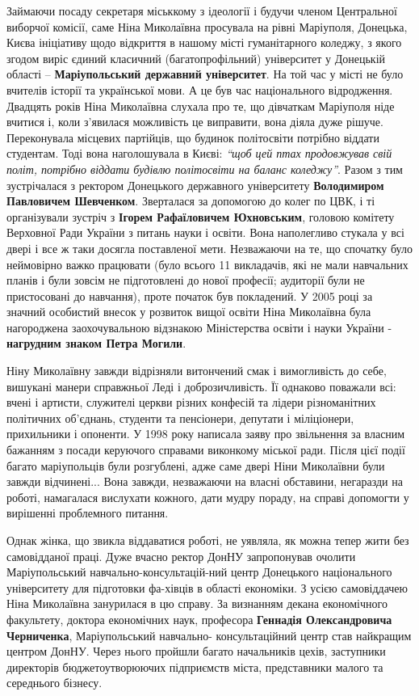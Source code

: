 Займаючи посаду секретаря міськкому з ідеології і будучи членом Центральної
виборчої комісії, саме Ніна Миколаївна просувала на рівні Маріуполя, Донецька,
Києва ініціативу щодо відкриття в нашому місті гуманітарного коледжу, з якого
згодом виріс єдиний класичний (багатопрофільний) університет у Донецькій
області – \textbf{Маріупольський державний університет}. На той час у місті не
було вчителів історії та української мови. А це був час національного
відродження.  Двадцять років Ніна Миколаївна слухала про те, що дівчаткам
Маріуполя ніде вчитися і, коли з'явилася можливість це виправити, вона діяла
дуже рішуче.  Переконувала місцевих партійців, що будинок політосвіти потрібно
віддати студентам. Тоді вона наголошувала в Києві: \emph{\enquote{щоб цей птах
продовжував свій політ, потрібно віддати будівлю політосвіти на баланс
коледжу}}. Разом з тим зустрічалася з ректором Донецького державного
університету \textbf{Володимиром Павловичем Шевченком}. Зверталася за допомогою
до колег по ЦВК, і ті організували зустріч з \textbf{Ігорем Рафаїловичем
Юхновським}, головою комітету Верховної Ради України з питань науки і освіти.
Вона наполегливо стукала у всі двері і все ж таки досягла поставленої мети.
Незважаючи на те, що спочатку було неймовірно важко працювати (було всього 11
викладачів, які не мали навчальних планів і були зовсім не підготовлені до
нової професії; аудиторії були не пристосовані до навчання), проте початок був
покладений. У 2005 році за значний особистий внесок у розвиток вищої освіти
Ніна Миколаївна була нагороджена заохочувальною відзнакою Міністерства освіти і
науки України - \textbf{нагрудним знаком Петра Могили}.

Ніну Миколаївну завжди відрізняли витончений смак і вимогливість до себе,
вишукані манери справжньої Леді і доброзичливість. Її однаково поважали всі:
вчені і артисти, служителі церкви різних конфесій та лідери різноманітних
політичних об'єднань, студенти та пенсіонери, депутати і міліціонери,
прихильники і опоненти. У 1998 року написала заяву про звільнення за власним
бажанням з посади керуючого справами виконкому міської ради. Після цієї події
багато маріупольців були розгублені, адже саме двері Ніни Миколаївни були
завжди відчинені... Вона завжди, незважаючи на власні обставини, негаразди на
роботі, намагалася вислухати кожного, дати мудру пораду, на справі допомогти у
вирішенні проблемного питання.

Однак жінка, що звикла віддаватися роботі, не уявляла, як можна тепер жити без
самовідданої праці. Дуже вчасно ректор ДонНУ запропонував очолити
Маріупольський навчально-консультацій\hyp{}ний центр Донецького національного
університету для підготовки фа\hyp{}хівців в області економіки. З усією самовіддачею
Ніна Миколаївна занурилася в цю справу. За визнанням декана економічного
факультету, доктора економічних наук, професора \textbf{Геннадія Олександровича
Черниченка}, Маріупольський навчально- консультаційний центр став найкращим
центром ДонНУ. Через нього пройшли багато начальників цехів, заступники
директорів бюджетоутворюючих підприємств міста, представники малого та
середнього бізнесу.

